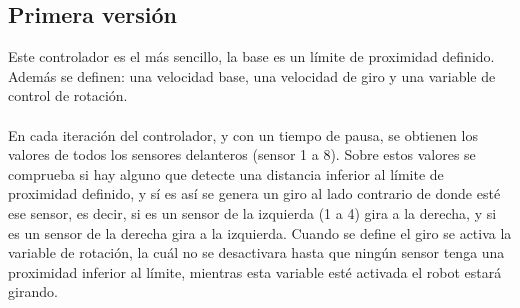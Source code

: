 \documentclass[14pt]{extarticle}
\theoremstyle{definition}
\theoremstyle{remark}
\begin{document}
\subsection{Primera versión}\label{subsec:primeraversion}
Este controlador es el más sencillo, la base es un límite de proximidad definido. Además se definen: una velocidad base, una velocidad de giro y una variable de control de rotación.\\\\
 En cada iteración del controlador, y con un tiempo de pausa, se obtienen los valores de todos los sensores delanteros (sensor 1 a 8). Sobre estos valores se comprueba si hay alguno que detecte una distancia inferior al límite de proximidad definido, y sí es así se genera un giro al lado contrario de donde esté ese sensor, es decir, si es un sensor de la izquierda (1 a 4) gira a la derecha, y si es un sensor de la derecha  gira a la izquierda. Cuando se define el giro se activa la variable de rotación, la cuál no se desactivara hasta que ningún sensor tenga una proximidad inferior al límite, mientras esta variable esté activada el robot estará girando.
\end{document}
